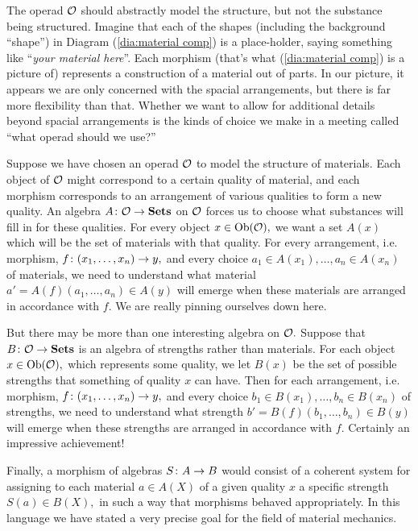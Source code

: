 \documentclass[CT4S-EN-RU]{subfiles}
\begin{document}
\begin{applicationENG}
The operad $\mathcal{O}$ should abstractly model the structure, but not the substance being structured. Imagine that each of the shapes (including the background “shape”) in Diagram (\ref{dia:material comp}) is a place-holder, saying something like “{\em your material here}”. Each morphism (that's what (\ref{dia:material comp}) is a picture of) represents a construction of a material out of parts. In our picture, it appears we are only concerned with the spacial arrangements, but there is far more flexibility than that. Whether we want to allow for additional details beyond spacial arrangements is the kinds of choice we make in a meeting called “what operad should we use?” 
\end{applicationENG}

\begin{applicationRUS}
\end{applicationRUS}

\begin{applicationENG}
Suppose we have chosen an operad $\mathcal{O}$ to model the structure of materials. Each object of $\mathcal{O}$ might correspond to a certain quality of material, and each morphism corresponds to an arrangement of various qualities to form a new quality. An algebra $A\colon\mathcal{O}\rightarrow{\mathbf{Sets}}$ on $\mathcal{O}$ forces us to choose what substances will fill in for these qualities. For every object $x\in\textnormal{Ob}(\mathcal{O}),$ we want a set $A(x)$ which will be the set of materials with that quality. For every arrangement, i.e. morphism, $f\colon (x_1,\ldots,x_n)\rightarrow y,$ and every choice $a_1\in A(x_1), \ldots, a_n\in A(x_n)$ of materials, we need to understand what material $a'=A(f)(a_1,\ldots,a_n)\in A(y)$ will emerge when these materials are arranged in accordance with $f.$ We are really pinning ourselves down here.

But there may be more than one interesting algebra on $\mathcal{O}.$ Suppose that $B\colon\mathcal{O}\rightarrow{\mathbf{Sets}}$ is an algebra of strengths rather than materials. For each object $x\in\textnormal{Ob}(\mathcal{O}),$ which represents some quality, we let $B(x)$ be the set of possible strengths that something of quality $x$ can have. Then for each arrangement, i.e. morphism, $f\colon (x_1,\ldots,x_n)\rightarrow y,$ and every choice $b_1\in B(x_1), \ldots, b_n\in B(x_n)$ of strengths, we need to understand what strength $b'=B(f)(b_1,\ldots,b_n)\in B(y)$ will emerge when these strengths are arranged in accordance with $f.$ Certainly an impressive achievement!

Finally, a morphism of algebras $S\colon A\rightarrow B$ would consist of a coherent system for assigning to each material $a\in A(X)$ of a given quality $x$ a specific strength $S(a)\in B(X),$ in such a way that morphisms behaved appropriately. In this language we have stated a very precise goal for the field of material mechanics.
\end{applicationENG}
\end{document}
